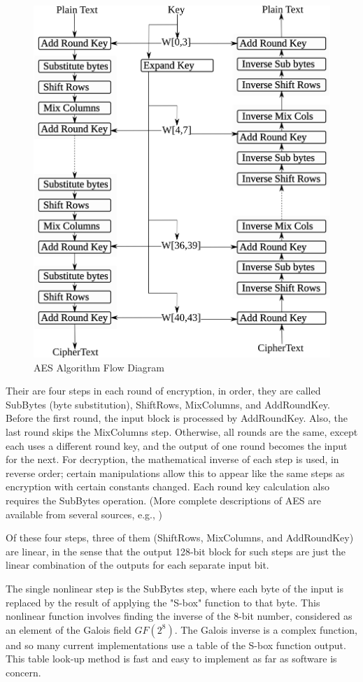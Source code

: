 \documentclass[10pt, conference, compsocconf]{IEEEtran}
\begin{document}
\begin{figure}
  \centering
    \includegraphics[width=0.50 \textwidth]{images/AES_structure.png}
  \caption{AES Algorithm Flow Diagram\cite{Processing_announcingthe}}
  \label{AES_structure}
\end{figure}

    Their are four steps in each round of encryption, in order, they are called SubBytes (byte substitution), ShiftRows, MixColumns, and AddRoundKey. Before the first round, the input block is processed by AddRoundKey. Also, the last round skips the MixColumns step. Otherwise, all rounds are the same, except each uses a different round key, and the output of one round becomes the input for the next. For decryption, the mathematical inverse of each step is used, in reverse order; certain manipulations allow this to appear like the same steps as encryption with certain constants changed. Each round key calculation also requires the SubBytes operation. (More complete descriptions of AES are available from several sources, e.g., \cite {Processing_announcingthe})

    Of these four steps, three of them (ShiftRows, MixColumns, and AddRoundKey) are linear, in the sense that the output 128-bit block for such steps are just the linear combination of the outputs for each separate input bit.

    The single nonlinear step is the SubBytes step, where each byte of the input is replaced by the result of applying the "S-box" function to that byte. This nonlinear function involves finding the inverse of the 8-bit number, considered as an element of the Galois field $GF(2^8)$. The Galois inverse is a complex function, and so many current implementations use a table of the S-box function output. This table look-up method is fast and easy to implement as far as software is concern.
    
\end{document}

